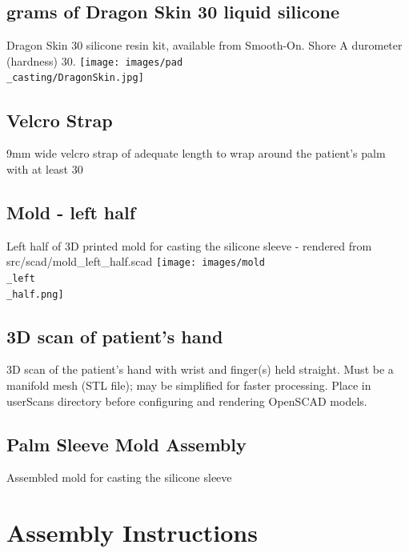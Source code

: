 \documentclass[11pt]{article}
\begin{document}
\hypertarget{thing_g\_dragon\_skin\_30}{\subsection{grams of Dragon Skin 30 liquid silicone}}
Dragon Skin 30 silicone resin kit, available from Smooth-On. Shore A durometer (hardness) 30.
\texttt{[image: images/pad\\\_casting/DragonSkin.jpg]}

\hypertarget{thing_velcro\_strap}{\subsection{Velcro Strap}}
9mm wide velcro strap of adequate length to wrap around the patient's palm with at least 30%

\hypertarget{thing_mold\_left\_half}{\subsection{Mold - left half}}
Left half of 3D printed mold for casting the silicone sleeve - rendered from src/scad/mold_left_half.scad
\texttt{[image: images/mold\\\_left\\\_half.png]}

\hypertarget{thing_hand\_scan}{\subsection{3D scan of patient's hand}}
3D scan of the patient's hand with wrist and finger(s) held straight. Must be a manifold mesh (STL file); may be simplified for faster processing. Place in userScans directory before configuring and rendering OpenSCAD models.

\hypertarget{thing_mold\_assembly}{\subsection{Palm Sleeve Mold Assembly}}
Assembled mold for casting the silicone sleeve

\newpage

\section{Assembly Instructions}
\end{document}
